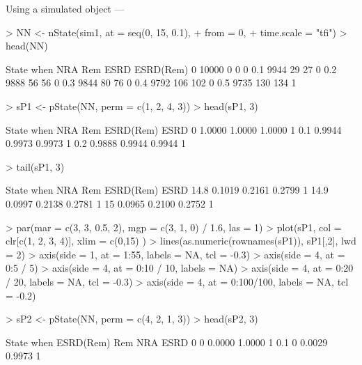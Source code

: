 \begin{frame}{Using a simulated  object --- }
\begin{Schunk}
\begin{Sinput}
> NN <- nState(sim1, at = seq(0, 15, 0.1),
+                  from = 0,
+            time.scale = "tfi")
> head(NN)
\end{Sinput}
\begin{Soutput}
     State
when    NRA   Rem  ESRD ESRD(Rem)
  0   10000     0     0         0
  0.1  9944    29    27         0
  0.2  9888    56    56         0
  0.3  9844    80    76         0
  0.4  9792   106   102         0
  0.5  9735   130   134         1
\end{Soutput}
\begin{Sinput}
> sP1 <- pState(NN, perm = c(1, 2, 4, 3))
> head(sP1, 3)
\end{Sinput}
\begin{Soutput}
     State
when     NRA    Rem ESRD(Rem) ESRD
  0   1.0000 1.0000    1.0000    1
  0.1 0.9944 0.9973    0.9973    1
  0.2 0.9888 0.9944    0.9944    1
\end{Soutput}
\begin{Sinput}
> tail(sP1, 3)
\end{Sinput}
\begin{Soutput}
      State
when      NRA    Rem ESRD(Rem) ESRD
  14.8 0.1019 0.2161    0.2799    1
  14.9 0.0997 0.2138    0.2781    1
  15   0.0965 0.2100    0.2752    1
\end{Soutput}
\begin{Sinput}
> par(mar = c(3, 3, 0.5, 2), mgp = c(3, 1, 0) / 1.6, las = 1)
> plot(sP1, col = clr[c(1, 2, 3, 4)], xlim = c(0,15) )
> lines(as.numeric(rownames(sP1)), sP1[,2], lwd = 2)
> axis(side = 1, at = 1:55, labels = NA, tcl = -0.3)
> axis(side = 4, at = 0:5 / 5)
> axis(side = 4, at = 0:10 / 10, labels = NA)
> axis(side = 4, at = 0:20 / 20, labels = NA, tcl = -0.3)
> axis(side = 4, at = 0:100/100, labels = NA, tcl = -0.2)
\end{Sinput}
\end{Schunk}
\begin{Schunk}
\begin{Sinput}
> sP2 <- pState(NN, perm = c(4, 2, 1, 3))
> head(sP2, 3)
\end{Sinput}
\begin{Soutput}
     State
when  ESRD(Rem)    Rem    NRA ESRD
  0           0 0.0000 1.0000    1
  0.1         0 0.0029 0.9973    1

\end{Soutput}
\end{Schunk}
\end{frame}
